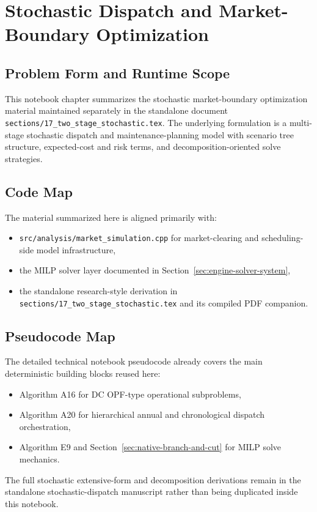 \section{Stochastic Dispatch and Market-Boundary Optimization}
\label{sec:stochastic-dispatch-summary}

\subsection{Problem Form and Runtime Scope}

This notebook chapter summarizes the stochastic market-boundary optimization
material maintained separately in the standalone document
\texttt{sections/17\_two\_stage\_stochastic.tex}.  The underlying formulation is
a multi-stage stochastic dispatch and maintenance-planning model with scenario
tree structure, expected-cost and risk terms, and decomposition-oriented solve
strategies.

\subsection{Code Map}

The material summarized here is aligned primarily with:
\begin{itemize}
  \item \texttt{src/analysis/market\_simulation.cpp} for market-clearing and scheduling-side model infrastructure,
  \item the MILP solver layer documented in Section~\ref{sec:engine-solver-system},
  \item the standalone research-style derivation in \texttt{sections/17\_two\_stage\_stochastic.tex} and its compiled PDF companion.
\end{itemize}

\subsection{Pseudocode Map}

The detailed technical notebook pseudocode already covers the main deterministic
building blocks reused here:
\begin{itemize}
  \item Algorithm A16 for DC OPF-type operational subproblems,
  \item Algorithm A20 for hierarchical annual and chronological dispatch orchestration,
  \item Algorithm E9 and Section~\ref{sec:native-branch-and-cut} for MILP solve mechanics.
\end{itemize}
The full stochastic extensive-form and decomposition derivations remain in the
standalone stochastic-dispatch manuscript rather than being duplicated inside
this notebook.

